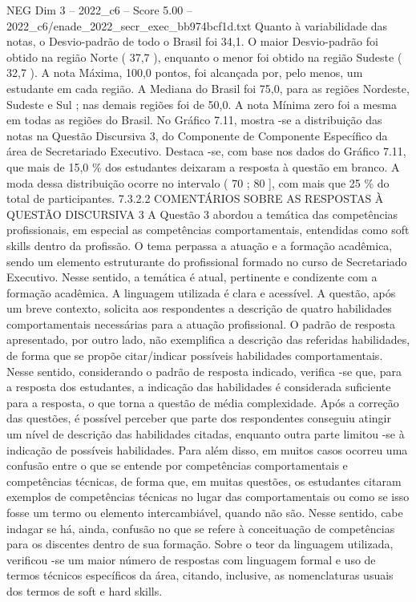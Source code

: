 \begin{textsample}{NEG Dim 3 – 2022\_c6 – Score 5.00 – 2022\_c6/enade\_2022\_secr\_exec\_bb974bcf1d.txt}
Quanto à variabilidade das notas, o Desvio-padrão de todo o Brasil foi 34,1.
O maior Desvio-padrão foi obtido na região Norte ( 37,7 ), enquanto o menor foi obtido na região Sudeste ( 32,7 ).
A nota Máxima, 100,0 pontos, foi alcançada por, pelo menos, um estudante em cada região.
A Mediana do Brasil foi 75,0, para as regiões Nordeste, Sudeste e Sul ; nas demais regiões foi de 50,0.
A nota Mínima zero foi a mesma em todas as regiões do Brasil.
No Gráfico 7.11, mostra -se a distribuição das notas na Questão Discursiva 3, do Componente de Componente Específico da área de Secretariado Executivo.
Destaca -se, com base nos dados do Gráfico 7.11, que mais de 15,0 \% dos estudantes deixaram a resposta à questão em branco.
A moda dessa distribuição ocorre no intervalo ( 70 ; 80 ], com mais que 25 \% do total de participantes. 7.3.2.2 COMENTÁRIOS SOBRE AS RESPOSTAS À QUESTÃO DISCURSIVA 3 A Questão 3 abordou a temática das competências profissionais, em especial as competências comportamentais, entendidas como soft skills dentro da profissão.
O tema perpassa a atuação e a formação acadêmica, sendo um elemento estruturante do profissional formado no curso de Secretariado Executivo.
Nesse sentido, a temática é atual, pertinente e condizente com a formação acadêmica.
A linguagem utilizada é clara e acessível.
A questão, após um breve contexto, solicita aos respondentes a descrição de quatro habilidades comportamentais necessárias para a atuação profissional.
O padrão de resposta apresentado, por outro lado, não exemplifica a descrição das referidas habilidades, de forma que se propõe citar/indicar possíveis habilidades comportamentais.
Nesse sentido, considerando o padrão de resposta indicado, verifica -se que, para a resposta dos estudantes, a indicação das habilidades é considerada suficiente para a resposta, o que torna a questão de média complexidade.
Após a correção das questões, é possível perceber que parte dos respondentes conseguiu atingir um nível de descrição das habilidades citadas, enquanto outra parte limitou -se à indicação de possíveis habilidades.
Para além disso, em muitos casos ocorreu uma confusão entre o que se entende por competências comportamentais e competências técnicas, de forma que, em muitas questões, os estudantes citaram exemplos de competências técnicas no lugar das comportamentais ou como se isso fosse um termo ou elemento intercambiável, quando não são.
Nesse sentido, cabe indagar se há, ainda, confusão no que se refere à conceituação de competências para os discentes dentro de sua formação.
Sobre o teor da linguagem utilizada, verificou -se um maior número de respostas com linguagem formal e uso de termos técnicos específicos da área, citando, inclusive, as nomenclaturas usuais dos termos de soft e hard skills.

\end{textsample}
